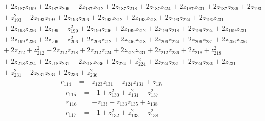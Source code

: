 \begin{align*}
&\quad +2z_{187}z_{199}+2z_{187}z_{206}+2z_{187}z_{212}+2z_{187}z_{218}+2z_{187}z_{224}+2z_{187}z_{231}+2z_{187}z_{236}+2z_{193}\\
&\quad +z_{193}^{2}+2z_{193}z_{199}+2z_{193}z_{206}+2z_{193}z_{212}+2z_{193}z_{218}+2z_{193}z_{224}+2z_{193}z_{231}\\
&\quad +2z_{193}z_{236}+2z_{199}+z_{199}^{2}+2z_{199}z_{206}+2z_{199}z_{212}+2z_{199}z_{218}+2z_{199}z_{224}+2z_{199}z_{231}\\
&\quad +2z_{199}z_{236}+2z_{206}+z_{206}^{2}+2z_{206}z_{212}+2z_{206}z_{218}+2z_{206}z_{224}+2z_{206}z_{231}+2z_{206}z_{236}\\
&\quad +2z_{212}+z_{212}^{2}+2z_{212}z_{218}+2z_{212}z_{224}+2z_{212}z_{231}+2z_{212}z_{236}+2z_{218}+z_{218}^{2}\\
&\quad +2z_{218}z_{224}+2z_{218}z_{231}+2z_{218}z_{236}+2z_{224}+z_{224}^{2}+2z_{224}z_{231}+2z_{224}z_{236}+2z_{231}\\
&\quad +z_{231}^{2}+2z_{231}z_{236}+2z_{236}+z_{236}^{2}
\end{align*}
\begin{align*}
r_{114} &=-z_{123}z_{131}-z_{124}z_{131}+z_{137}
\end{align*}
\begin{align*}
r_{115} &=-1+z_{130}^{2}+z_{131}^{2}-z_{137}^{2}
\end{align*}
\begin{align*}
r_{116} &=-z_{133}-z_{133}z_{135}+z_{138}
\end{align*}
\begin{align*}
r_{117} &=-1+z_{132}^{2}+z_{133}^{2}-z_{138}^{2}
\end{align*}

